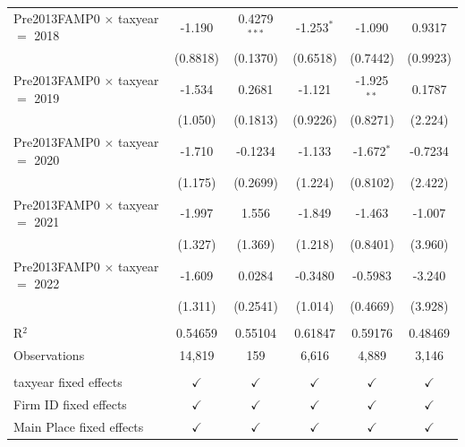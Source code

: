 \begin{tabular}{lccccc}
   Pre2013FAMP0 $\times$ taxyear $=$ 2018  & -1.190        & 0.4279$^{***}$  & -1.253$^{*}$  & -1.090         & 0.9317\\   
                                           & (0.8818)      & (0.1370)        & (0.6518)      & (0.7442)       & (0.9923)\\   
   Pre2013FAMP0 $\times$ taxyear $=$ 2019  & -1.534        & 0.2681          & -1.121        & -1.925$^{**}$  & 0.1787\\   
                                           & (1.050)       & (0.1813)        & (0.9226)      & (0.8271)       & (2.224)\\   
   Pre2013FAMP0 $\times$ taxyear $=$ 2020  & -1.710        & -0.1234         & -1.133        & -1.672$^{*}$   & -0.7234\\   
                                           & (1.175)       & (0.2699)        & (1.224)       & (0.8102)       & (2.422)\\   
   Pre2013FAMP0 $\times$ taxyear $=$ 2021  & -1.997        & 1.556           & -1.849        & -1.463         & -1.007\\   
                                           & (1.327)       & (1.369)         & (1.218)       & (0.8401)       & (3.960)\\   
   Pre2013FAMP0 $\times$ taxyear $=$ 2022  & -1.609        & 0.0284          & -0.3480       & -0.5983        & -3.240\\   
                                           & (1.311)       & (0.2541)        & (1.014)       & (0.4669)       & (3.928)\\   
    \\
   R$^2$                                   & 0.54659       & 0.55104         & 0.61847       & 0.59176        & 0.48469\\  
   Observations                            & 14,819        & 159             & 6,616         & 4,889          & 3,146\\  
    \\
   taxyear fixed effects                   & $\checkmark$  & $\checkmark$    & $\checkmark$  & $\checkmark$   & $\checkmark$\\   
   Firm ID fixed effects                   & $\checkmark$  & $\checkmark$    & $\checkmark$  & $\checkmark$   & $\checkmark$\\   
   Main Place fixed effects                & $\checkmark$  & $\checkmark$    & $\checkmark$  & $\checkmark$   & $\checkmark$\\   
   \bottomrule
\end{tabular}
\par\endgroup
